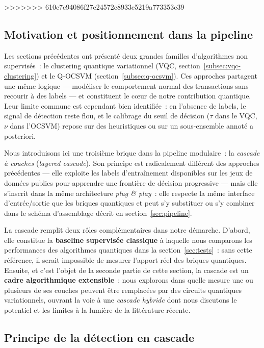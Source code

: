 \documentclass[a4paper]{article}
\begin{document}
>>>>>>> 610c7c94086f27e24572c8933e5219a773353c39
\label{sec:cascade}
 
\subsection{Motivation et positionnement dans la pipeline}
 
Les sections précédentes ont présenté deux grandes familles d'algorithmes non supervisés~: le clustering quantique variationnel (VQC, section~\ref{subsec:vqc-clustering}) et le Q-OCSVM (section~\ref{subsec:q-ocsvm}). Ces approches partagent une même logique --- modéliser le comportement normal des transactions sans recourir à des labels --- et constituent le c\oe ur de notre contribution quantique. Leur limite commune est cependant bien identifiée~: en l'absence de labels, le signal de détection reste flou, et le calibrage du seuil de décision ($\tau$ dans le VQC, $\nu$ dans l'OCSVM) repose sur des heuristiques ou sur un sous-ensemble annoté a posteriori.
 
Nous introduisons ici une troisième brique dans la pipeline modulaire~: la \emph{cascade à couches} (\textit{layered cascade}). Son principe est radicalement différent des approches précédentes --- elle exploite les labels d'entraînement disponibles sur les jeux de données publics pour apprendre une frontière de décision progressive --- mais elle s'inscrit dans la même architecture \textit{plug \& play}~: elle respecte la même interface d'entrée/sortie que les briques quantiques et peut s'y substituer ou s'y combiner dans le schéma d'assemblage décrit en section~\ref{sec:pipeline}.
 
La cascade remplit deux rôles complémentaires dans notre démarche. D'abord, elle constitue la \textbf{baseline supervisée classique} à laquelle nous comparons les performances des algorithmes quantiques dans la section~\ref{sec:tests}~: sans cette référence, il serait impossible de mesurer l'apport réel des briques quantiques. Ensuite, et c'est l'objet de la seconde partie de cette section, la cascade est un \textbf{cadre algorithmique extensible}~: nous explorons dans quelle mesure une ou plusieurs de ses couches peuvent être remplacées par des circuits quantiques variationnels, ouvrant la voie à une \emph{cascade hybride} dont nous discutons le potentiel et les limites à la lumière de la littérature récente.
 
\subsection{Principe de la détection en cascade}
 
\end{document}
